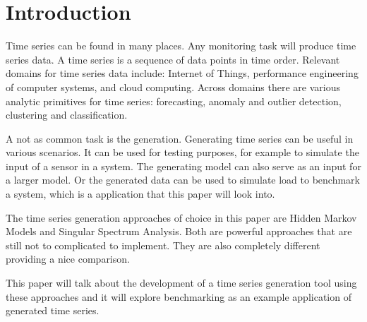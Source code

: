 
\chapter{Introduction}\label{chapter:introduction}

Time series can be found in many places. Any monitoring task will produce time series data.  A time series is a sequence of data points in time order.  Relevant domains for time series data include:  Internet of Things,  performance engineering of computer systems, and cloud computing. Across domains there are various analytic primitives for time series: forecasting, anomaly and outlier detection, clustering and classification.

A not as common task is the generation. Generating time series can be useful in various scenarios. It can be used for testing purposes, for example to simulate the input of a sensor in a system. The generating model can also serve as an input for a larger model. Or the generated data can be used to simulate load to benchmark a system, which is a application that this paper will look into. 

The time series generation approaches of choice in this paper are Hidden Markov Models and Singular Spectrum Analysis. Both are powerful approaches that are still not to complicated to implement. They are also completely different providing a nice comparison. 

This paper will talk about the development of a time series generation tool using these approaches and it will explore benchmarking as an example application of generated time series. 